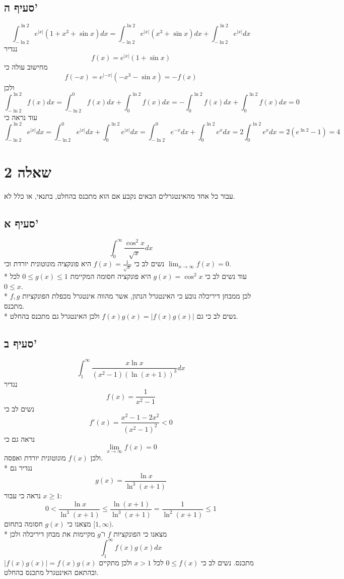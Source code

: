 \subsection{סעיף ה'}
\[
	\int_{-\ln 2}^{\ln 2} e^{|x|} (1 + x^3 + \sin x) dx
	= \int_{-\ln 2}^{\ln 2} e^{|x|} (x^3 + \sin x) dx
	+ \int_{-\ln 2}^{\ln 2} e^{|x|} dx
\]
נגדיר
\[
	f(x) = e^{|x|} (1 + \sin x)
\]
מחישוב עולה כי
\[
	f(-x) = e^{|-x|} (-x^3 - \sin x) = - f(x)
\]
ולכן
\[
	\int_{-\ln 2}^{\ln 2} f(x) dx
	= \int_{-\ln 2}^{0} f(x) dx + \int_{0}^{\ln 2} f(x) dx
	= -\int_{0}^{\ln 2} f(x) dx + \int_{0}^{\ln 2} f(x) dx
	= 0
\]
עוד נראה כי
\[
	\int_{-\ln 2}^{\ln 2} e^{|x|} dx
	= \int_{-\ln 2}^{0} e^{|x|} dx + \int_{0}^{\ln 2} e^{|x|} dx
	= \int_{-\ln 2}^{0} e^{-x} dx + \int_{0}^{\ln 2} e^{x} dx
	= 2\int_{0}^{\ln 2} e^{x} dx
	= 2 (e^{\ln 2} - 1) = 4
\]

\section{שאלה 2}
עבור כל אחד מהאינטגרלים הבאים נקבע אם הוא מתכנס בהחלט, בתנאי, או כלל לא.

\subsection{סעיף א'}
\[
	\int_0^\infty \frac{\cos^2 x}{\sqrt{x}}dx
\]
נשים לב כי $f(x) = \frac{1}{\sqrt{x}}$ היא פונקציה מונוטונית יורדת וכי $\lim_{x \to \infty} f(x) = 0$. \\*
עוד נשים לב כי $g(x) = \cos^2 x$ היא פונקציה חסומה המקיימת $0 \le g(x) \le 1$ לכל $0 \le x$. \\*
לכן ממבחן דיריכלה נובע כי האינטגרל הנתון, אשר מהווה אינטגרל מכפלת הפונקציות $f, g$ מתכנס. \\*
נשים לב כי גם $f(x) g(x) = |f(x) g(x)|$ ולכן האינטגרל גם מתכנס בהחלט.

\subsection{סעיף ב'}
\[
	\int_1^\infty \frac{x \ln x}{(x^2 - 1){(\ln(x + 1))}^3} dx
\]
נגדיר
\[
	f(x) = \frac{1}{x^2 - 1}
\]
נשים לב כי
\[
	f'(x) = \frac{x^2 - 1 - 2x^2}{{(x^2 - 1)}^2} < 0
\]
נראה גם כי
\[
	\lim_{x \to \infty} f(x) = 0
\]
ולכן $f(x)$ מונוטונית יורדת ואפסה. \\*
נגדיר גם
\[
	g(x) = \frac{\ln x}{\ln^3(x + 1)}
\]
נראה כי עבור $x \ge 1$:
\[
	0 < \frac{\ln x}{\ln^3(x + 1)}
	\le \frac{\ln(x + 1)}{\ln^3(x + 1)}
	= \frac{1}{\ln^2(x + 1)} \le 1
\]
מצאנו כי $g(x)$ חסומה בתחום $[1, \infty)$. \\* %
מצאנו כי הפונקציות $f$ ו־$g$ מקיימות את מבחן דיריכלה ולכן
\[
	\int_1^\infty f(x) g(x) dx
\]
מתכנס. נשים לב כי $0 \le f(x)$ לכל $x > 1$ ולכן מתקיים $|f(x) g(x)| = f(x) g(x)$ ובהתאם האינטגרל מתכנס בהחלט.

